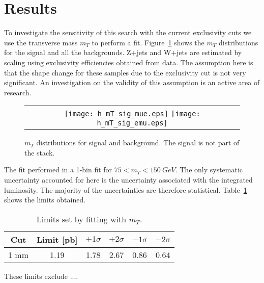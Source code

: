 \section{Results}
\label{sec:results}

To investigate the sensitivity of this search with the current exclusivity cuts 
we use the transverse mass $m_T$ to perform a fit. Figure~\ref{fig:mT}
shows the $m_T$ distributions for the signal and all the backgrounds.
Z+jets and W+jets are estimated by scaling using exclusivity efficiencies obtained 
from data. The assumption here is that the shape change for these samples due to 
the exclusivity cut is not very significant. An investigation on the validity of this 
assumption is an active area of research. 
 
\begin{figure}[!h]
\centering
\begin{tabular}{c}
	\texttt{[image: h\_mT\_sig\_mue.eps]}
	\texttt{[image: h\_mT\_sig\_emu.eps]}
\end{tabular}
\caption{$m_{T}$ distributions for signal and background. The signal is not part of the stack.}
\label{fig:mT}
\end{figure}

The fit performed in a 1-bin fit for $75<m_T<150\ GeV$. The only systematic uncertainty accounted for 
here is the uncertainty associated with the integrated luminosity. The majority of the uncertainties 
are therefore statistical. Table~\ref{table:limits} shows the limits obtained. 

\begin{table}[!h]
\begin{center}
\begin{tabular}{cc|cccc}
Cut & Limit [pb] & $+1\sigma$ & $+2\sigma$ & $-1\sigma$ & $-2\sigma$ \\
\hline
1 mm & 1.19 & 1.78 & 2.67 & 0.86 & 0.64 \\
\end{tabular}
\end{center}
\caption{Limits set by fitting with $m_T$.}
\label{table:limits}
\end{table}

These limits exclude .... 
